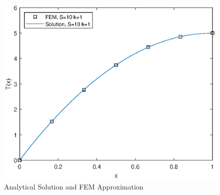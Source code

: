\begin{figure}[htb!]
    \centering
    \includegraphics{./homework2/img/final_FEM.eps}
    \caption{Analytical Solution and FEM Approximation}
    \label{fig:sol_FEM}
\end{figure}
